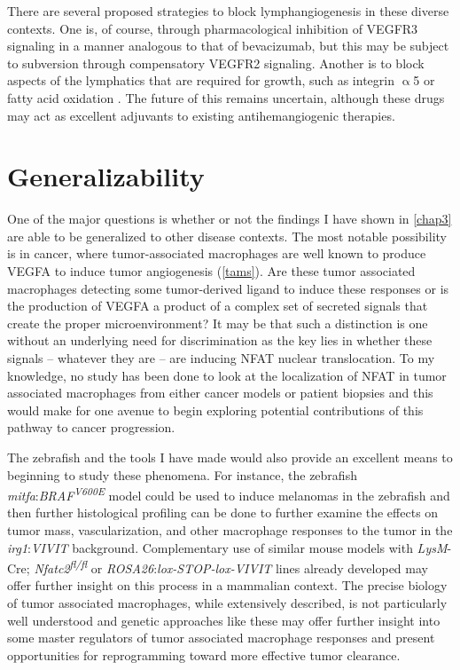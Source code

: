 There are several proposed strategies to block lymphangiogenesis in these diverse contexts. One is, of course, through pharmacological inhibition of VEGFR3 signaling in a manner analogous to that of bevacizumab, but this may be subject to subversion through compensatory VEGFR2 signaling. Another is to block aspects of the lymphatics that are required for growth, such as integrin $\upalpha$5 \citep{Dietrich2007} or fatty acid oxidation \citep{Wong2017b}. The future of this remains uncertain, although these drugs may act as excellent adjuvants to existing antihemangiogenic therapies.

\section{Generalizability}

One of the major questions is whether or not the findings I have shown in \autoref{chap3} are able to be generalized to other disease contexts. The most notable possibility is in cancer, where tumor-associated macrophages are well known to produce VEGFA to induce tumor angiogenesis (\autoref{tams}). Are these tumor associated macrophages detecting some tumor-derived ligand to induce these responses or is the production of VEGFA a product of a complex set of secreted signals that create the proper microenvironment? It may be that such a distinction is one without an underlying need for discrimination as the key lies in whether these signals -- whatever they are -- are inducing NFAT nuclear translocation. To my knowledge, no study has been done to look at the localization of NFAT in tumor associated macrophages from either cancer models or patient biopsies and this would make for one avenue to begin exploring potential contributions of this pathway to cancer progression. 

The zebrafish and the tools I have made would also provide an excellent means to beginning to study these phenomena. For instance, the zebrafish \textit{mitfa}:\textit{BRAF\textsuperscript{V600E}} model could be used to induce melanomas in the zebrafish and then further histological profiling can be done to further examine the effects on tumor mass, vascularization, and other macrophage responses to the tumor in the \textit{irg1}:\textit{VIVIT} background. Complementary use of similar mouse models with \textit{LysM}-Cre; \textit{Nfatc2\textsuperscript{fl/fl}} or \textit{ROSA26}:\textit{lox-STOP-lox-VIVIT} lines already developed may offer further insight on this process in a mammalian context. The precise biology of tumor associated macrophages, while extensively described, is not particularly well understood and genetic approaches like these may offer further insight into some master regulators of tumor associated macrophage responses and present opportunities for reprogramming toward more effective tumor clearance. 

